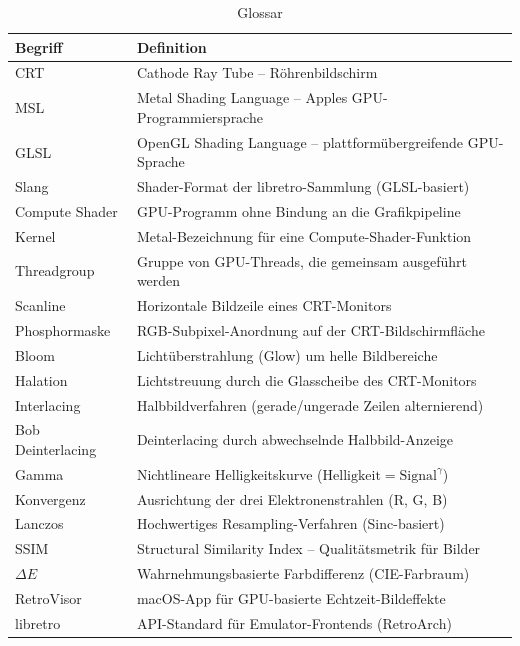 \documentclass[11pt, a4paper]{article}
\newcommand{\tableheadercolor}{\rowcolor{hkared}}
\newcommand{\thw}[1]{\color{white}\textbf{#1}}  %
\begin{document}
\begin{table}[H]
\centering
\small
{}
\begin{tabularx}{\textwidth}{lX}
    \toprule
    \tableheadercolor \thw{Begriff} & \thw{Definition} \\
    \midrule
    CRT & Cathode Ray Tube -- R\"ohrenbildschirm \\
    MSL & Metal Shading Language -- Apples GPU-Programmiersprache \\
    GLSL & OpenGL Shading Language -- plattform\"ubergreifende GPU-Sprache \\
    Slang & Shader-Format der libretro-Sammlung (GLSL-basiert) \\
    Compute Shader & GPU-Programm ohne Bindung an die Grafikpipeline \\
    Kernel & Metal-Bezeichnung f\"ur eine Compute-Shader-Funktion \\
    Threadgroup & Gruppe von GPU-Threads, die gemeinsam ausgef\"uhrt werden \\
    Scanline & Horizontale Bildzeile eines CRT-Monitors \\
    Phosphormaske & RGB-Subpixel-Anordnung auf der CRT-Bildschirmfl\"ache \\
    Bloom & Licht\"uberstrahlung (Glow) um helle Bildbereiche \\
    Halation & Lichtstreuung durch die Glasscheibe des CRT-Monitors \\
    Interlacing & Halbbildverfahren (gerade/ungerade Zeilen alternierend) \\
    Bob Deinterlacing & Deinterlacing durch abwechselnde Halbbild-Anzeige \\
    Gamma & Nichtlineare Helligkeitskurve ($\text{Helligkeit} = \text{Signal}^\gamma$) \\
    Konvergenz & Ausrichtung der drei Elektronenstrahlen (R, G, B) \\
    Lanczos & Hochwertiges Resampling-Verfahren (Sinc-basiert) \\
    SSIM & Structural Similarity Index -- Qualit\"atsmetrik f\"ur Bilder \\
    $\Delta E$ & Wahrnehmungsbasierte Farbdifferenz (CIE-Farbraum) \\
    RetroVisor & macOS-App f\"ur GPU-basierte Echtzeit-Bildeffekte \\
    libretro & API-Standard f\"ur Emulator-Frontends (RetroArch) \\
    \bottomrule
\end{tabularx}
 \vspace{.125cm}
\caption{Glossar}
\end{table}
\end{document}
